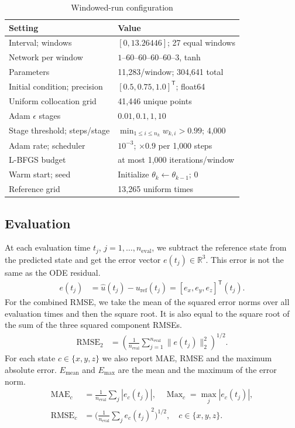\documentclass[conference]{IEEEtran}
\begin{document}
\begin{table}[t]
\caption{Windowed-run configuration}
\label{tab:config}
\centering\footnotesize
\begin{tabular}{ll}
\toprule
Setting & Value\\
\midrule
Interval; windows & $[0,13.26446]$; 27 equal windows\\
Network per window & $1$--$60$--$60$--$60$--$60$--$3$, tanh\\
Parameters & 11,283/window; 304,641 total\\
Initial condition; precision & $[0.5,0.75,1.0]^\mathsf{T}$; float64\\
Uniform collocation grid & 41,446 unique points\\
Adam $\epsilon$ stages & $0.01,0.1,1,10$\\
Stage threshold; steps/stage & $\min_{1\leq i\leq n_k}w_{k,i}>0.99$; 4,000\\
Adam rate; scheduler & $10^{-3}$; $\times0.9$ per 1,000 steps\\
L-BFGS budget & at most 1,000 iterations/window\\
Warm start; seed & Initialize $\theta_k\gets\theta_{k-1}$; 0\\
Reference grid & 13,265 uniform times\\
\bottomrule
\end{tabular}
\end{table}

\subsection{Evaluation}
At each evaluation time $t_j$, $j=1,\ldots,n_{\mathrm{eval}}$, we subtract the reference state from the predicted state and get the error vector $e(t_j)\in\mathbb{R}^3$. This error is not the same as the ODE residual.
\[
\begin{aligned}
e(t_j)&=\hat{u}(t_j)-u_{\mathrm{ref}}(t_j)=[e_x,e_y,e_z]^\mathsf{T}(t_j).
\end{aligned}
\]
For the combined RMSE, we take the mean of the squared error norms over all evaluation times and then the square root. It is also equal to the square root of the sum of the three squared component RMSEs.
\begin{equation}
\begin{aligned}
\operatorname{RMSE}_2
  &=\left(
      \frac{1}{n_{\mathrm{eval}}}
      \sum_{j=1}^{n_{\mathrm{eval}}}
      \|e(t_j)\|_2^2
     \right)^{1/2}.
\end{aligned}
\label{eq:rmse}
\end{equation}
For each state $c\in\{x,y,z\}$ we also report MAE, RMSE and the maximum absolute error. $E_{\mathrm{mean}}$ and $E_{\mathrm{max}}$ are the mean and the maximum of the error norm.
\[
\begin{aligned}
\operatorname{MAE}_c&=\tfrac{1}{n_{\mathrm{eval}}}\textstyle\sum_j|e_c(t_j)|,\quad \operatorname{Max}_c=\max_j|e_c(t_j)|,\\
\operatorname{RMSE}_c&=\bigl(\tfrac{1}{n_{\mathrm{eval}}}\textstyle\sum_j e_c(t_j)^2\bigr)^{1/2},\quad c\in\{x,y,z\}.
\end{aligned}
\]
\end{document}
